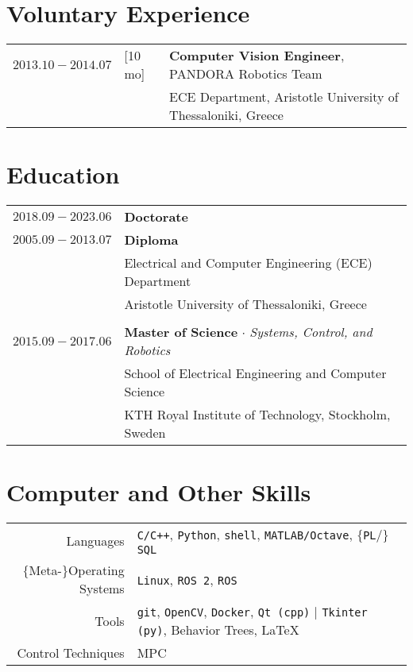 \documentclass[a4paper,10pt,twoside]{article}
\begin{document}
\section{Voluntary Experience}

\begin{tabular}{rlp{12cm}}
$2013.10 - 2014.07$ & \hspace{-0.4cm} [10 mo] & \textbf{Computer Vision Engineer}, PANDORA Robotics Team \\
                    & & ECE Department, Aristotle University of Thessaloniki, Greece
\end{tabular}



\section{Education}

\begin{tabular}{rp{12cm}}
$2018.09 - 2023.06$ & \textbf{Doctorate} \\
$2005.09 - 2013.07$ & \textbf{Diploma} \\
                    & Electrical and Computer Engineering (ECE) Department\\
                    & Aristotle University of Thessaloniki, Greece \\
&\\
$2015.09 - 2017.06$ & \textbf{Master of Science} $\cdot$ \textit{Systems, Control, and Robotics}\\
                    & School of Electrical Engineering and Computer Science\\
                    & KTH Royal Institute of Technology, Stockholm, Sweden\\
\end{tabular}


\section{Computer and Other Skills}

\begin{tabular}{rp{12cm}}
Languages & \texttt{C/C++}, \texttt{Python}, \texttt{shell}, \texttt{MATLAB/Octave}, $\{$\texttt{PL}/$\}$\texttt{SQL}\\
$\{$Meta-$\}$Operating Systems & \texttt{Linux}, \texttt{ROS 2}, \texttt{ROS} \\
Tools & \texttt{git}, \texttt{OpenCV}, \texttt{Docker}, \texttt{Qt (cpp)} | \texttt{Tkinter (py)}, Behavior Trees, \LaTeX \\
Control Techniques & MPC \\
\end{tabular}
\end{document}
